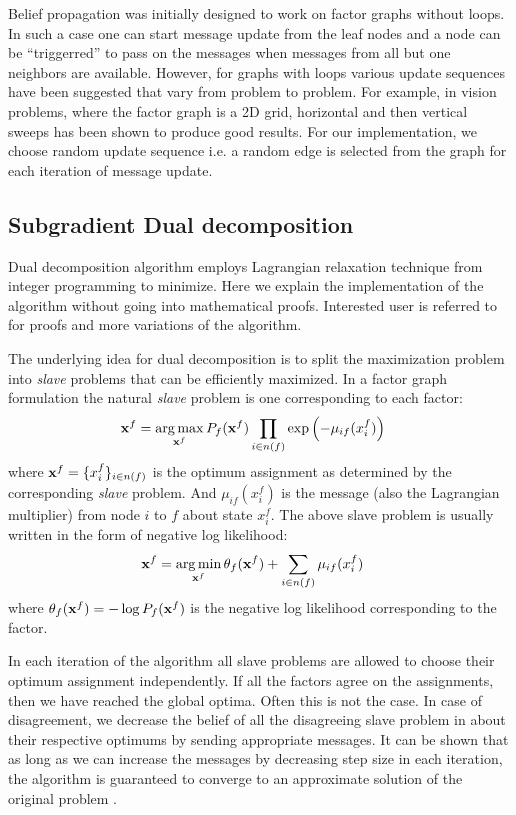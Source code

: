 \documentclass[letterpaper, 10 pt, conference]{ieeeconf} %
\DeclareMathOperator*{\argmin}{arg\,min}
\DeclareMathOperator*{\argmax}{arg\,max}
\begin{document}
Belief propagation was initially designed to work on factor graphs without
loops. In such a case one can start message update from the leaf nodes and
a node can be ``triggerred'' to pass on the messages when messages from all 
but one neighbors are available. However, for graphs with loops various update
sequences have been suggested that vary from problem to problem. For example,
in vision problems, where the factor graph is a 2D grid, horizontal and then
vertical sweeps has been shown to produce good results.
For our implementation, we choose random update sequence i.e. a random edge is
selected from the graph for each iteration of message update.

\subsection{Subgradient Dual decomposition}
\newcommand{\msg}[3]{\mu_{#1#2}(#3)}
\newcommand{\assign}{\leftarrow}
\newcommand{\Sx}{L_i}

Dual decomposition algorithm employs Lagrangian relaxation technique from
integer programming to minimize. Here we explain the implementation of the
algorithm without going into mathematical proofs. Interested user is
referred to
\cite{sontag2011introduction,jojic2010accelerated,komodakis2009beyond} for
proofs and more variations of the algorithm. 

The underlying idea for dual decomposition is to split the maximization
problem into \emph{slave} problems that can be efficiently maximized. In a
factor graph formulation the natural \emph{slave} problem is one corresponding
to each factor:
\begin{align}
  \map^f &= \argmax\limits_{\map^f} P_f(\map^f)
  \prod\limits_{i \in n(f)}\exp\left(-\msg{i}{f}{x^f_i} \right)
\end{align}
where $\mathbf{x}^f = \{x_i^f\}_{i \in n(f)}$ is the optimum assignment 
as determined by the corresponding \emph{slave}
problem. And $\msg{i}{f}{x^f_i}$ is the message (also the Lagrangian
multiplier) from node $i$ to $f$ about state $x^f_i$. 
The above slave problem is usually written in the form of 
negative log likelihood:
\begin{align}
  \map^f &= \argmin\limits_{\map^f} \theta_f(\map^f)
  +\sum\limits_{i \in n(f)}\msg{i}{f}{x^f_i}
  \label{eq:slavemin}
\end{align}
where $\theta_f(\mathbf{x}^f) = -\log P_f(\mathbf{x}^f)$ is the negative log
likelihood corresponding to the factor.

In each iteration of the algorithm all slave problems are allowed to choose
their optimum assignment independently. If all the factors agree on the
assignments, then we have reached the global optima. Often this is
not the case. In case of disagreement, we decrease the belief of all the
disagreeing slave problem in about their respective optimums by sending
appropriate messages. It can be shown that as long as we can increase the
messages by decreasing step size in each iteration, the algorithm is guaranteed
to converge to an approximate solution of the original problem
\cite{sontag2011introduction}.
\end{document}
